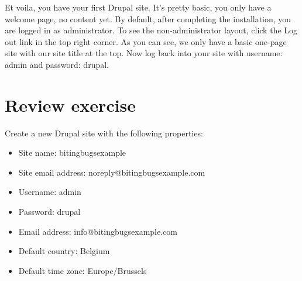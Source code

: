 Et voila, you have your first Drupal site. It’s pretty basic, you only have a welcome page, no content yet. By default, after completing the installation, you are logged in as administrator. To see the non-administrator layout, click the Log out link in the top right corner. As you can see, we only have a basic one-page site with our site title at the top. Now log back into your site with username: admin and password: drupal.

\section{Review exercise}

Create a new Drupal site with the following properties:
\begin{itemize}
    \item Site name: bitingbugsexample
    \item Site email address: noreply@bitingbugsexample.com
    \item Username: admin
    \item Password: drupal
    \item Email address: info@bitingbugsexample.com
    \item Default country: Belgium
    \item Default time zone: Europe/Brussels  
\end{itemize}







